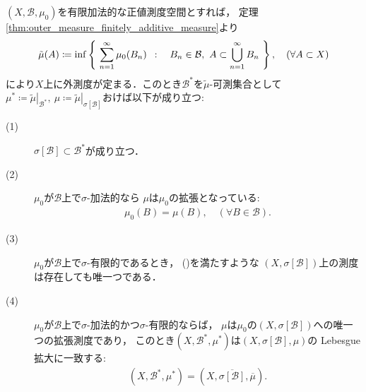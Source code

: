 		\begin{screen}
			\begin{thm}\label{thm:appendix_Kolmogorov_Hopf}
				$(X,\mathcal{B},\mu_0)$を有限加法的な正値測度空間とすれば，
				定理\ref{thm:outer_measure_finitely_additive_measure}より
				\begin{align}
					\tilde{\mu}(A) \coloneqq \operatorname*{inf}_{} \left\{\ \sum_{n=1}^\infty \mu_0(B_n)\ \, : \quad B_n \in \mathcal{B},\ A \subset \bigcup_{n=1}^\infty B_n\ \right\},
					\quad (\forall A \subset X)
				\end{align}
				により$X$上に外測度が定まる．このとき$\mathcal{B}^*$を$\tilde{\mu}$-可測集合として
				$\mu^* \coloneqq\left.\tilde{\mu}\right|_{\mathcal{B}^*},
				\ \mu \coloneqq \left.\tilde{\mu}\right|_{\sigma[\mathcal{B}]}$おけば以下が成り立つ:
				\begin{description}
					\item[(1)] $\sigma[\mathcal{B}] \subset \mathcal{B}^*$が成り立つ．
					
					\item[(2)] $\mu_0$が$\mathcal{B}$上で$\sigma$-加法的なら
						$\mu$は$\mu_0$の拡張となっている:
						\begin{align}
							\mu_0(B) = \mu(B),\quad (\forall B \in \mathcal{B}).
							\label{eq:appendix_finite_additive_measure_expansion_1}
						\end{align}
						
					\item[(3)] $\mu_0$が$\mathcal{B}$上で$\sigma$-有限的であるとき，
						()を満たすような
						$\left( X,\sigma[\mathcal{B}] \right)$上の測度は存在しても唯一つである．
					
					\item[(4)] $\mu_0$が$\mathcal{B}$上で$\sigma$-加法的かつ$\sigma$-有限的ならば，
						$\mu$は$\mu_0$の$\left( X,\sigma[\mathcal{B}] \right)$への唯一つの拡張測度であり，
						このとき$\left( X,\mathcal{B}^*,\mu^* \right)$は$(X,\sigma[\mathcal{B}],\mu)$の
						Lebesgue拡大に一致する:
						\begin{align}
							\left( X,\mathcal{B}^*,\mu^* \right) 
							= \left( X,\overline{\sigma[\mathcal{B}]},\overline{\mu} \right).
							\label{eq:appendix_finite_additive_measure_expansion_5}
						\end{align}
				\end{description}
			\end{thm}
		\end{screen}
		
